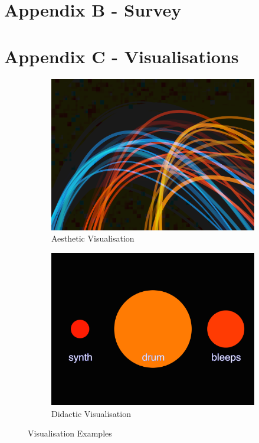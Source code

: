\documentclass[12pt]{article}
\begin{document}
\newpage
\section*{Appendix B - Survey}



\newpage
\section*{Appendix C - Visualisations}

\begin{figure}[H]
\centering
\begin{subfigure}{.5\textwidth}
    \centering
    \includegraphics[width=0.9\linewidth]{visualisations/aesthetic-vis.png}
    \caption{Aesthetic Visualisation}
    \label{avis}
\end{subfigure}%
\begin{subfigure}{.5\textwidth}
    \centering
    \includegraphics[width=0.9\linewidth]{visualisations/didactic-vis.png}
    \caption{Didactic Visualisation}
    \label{dvis}
\end{subfigure}
\caption{Visualisation Examples}
\end{figure}
\end{document}
